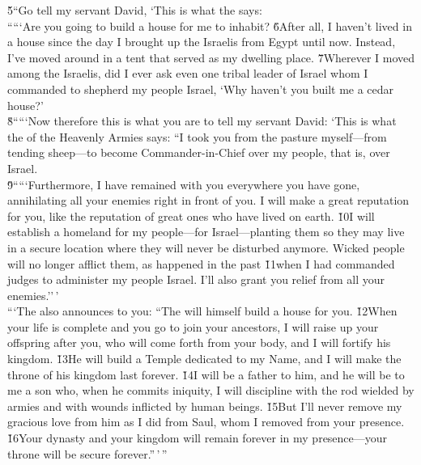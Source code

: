 \begin{poetry}
\poeml \v{5}``Go tell my servant David, `This is what the  says: \\
\poeml `````Are you going to build a house for me to inhabit? \v{6}After all, I haven't lived in a house since the day I brought up the Israelis from Egypt until now. Instead, I've moved around in a tent that served as my dwelling place. \v{7}Wherever I moved among the Israelis, did I ever ask even one tribal leader of Israel whom I commanded to shepherd my people Israel, `Why haven't you built me a cedar house?' \\
\poeml \v{8}`````Now therefore this is what you are to tell my servant David: `This is what the  of the Heavenly Armies says: ``I took you from the pasture myself---from tending sheep---to become Commander-in-Chief over my people, that is, over Israel. \\
\poeml \v{9}`````Furthermore, I have remained with you everywhere you have gone, annihilating all your enemies right in front of you. I will make a great reputation for you, like the reputation of great ones who have lived on earth. \v{10}I will establish a homeland for my people---for Israel---planting them so they may live in a secure location where they will never be disturbed anymore. Wicked people will no longer afflict them, as happened in the past \v{11}when I had commanded judges to administer my people Israel. I'll also grant you relief from all your enemies.''\,' \\
\poeml ```The  also announces to you: ``The  will himself build a house for you. \v{12}When your life is complete and you go to join your ancestors, I will raise up your offspring after you, who will come forth from your body, and I will fortify his kingdom. \v{13}He will build a Temple dedicated to my Name, and I will make the throne of his kingdom last forever. \v{14}I will be a father to him, and he will be to me a son who, when he commits iniquity, I will discipline with the rod wielded by armies and with wounds inflicted by human beings. \v{15}But I'll never remove my gracious love from him as I did from Saul, whom I removed from your presence. \v{16}Your dynasty and your kingdom will remain forever in my presence---your throne will be secure forever.''\,'\,''
\end{poetry}


